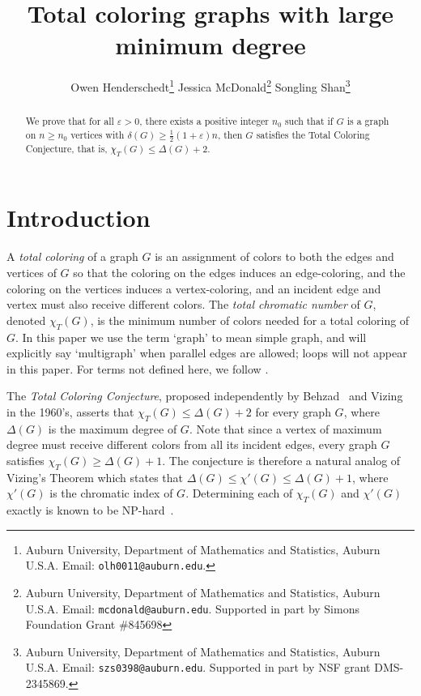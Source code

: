 \documentclass[11pt, oneside]{article}
\begin{document}
\title{Total coloring graphs with large minimum degree}
\author{
Owen Henderschedt\footnote{Auburn University, Department of Mathematics and Statistics, Auburn U.S.A.
  Email: {\tt olh0011@auburn.edu}.}    
\qquad
Jessica McDonald\footnote{Auburn University, Department of Mathematics and Statistics, Auburn U.S.A.
  Email: {\tt mcdonald@auburn.edu}.   
Supported in part by Simons Foundation Grant \#845698}
\qquad
Songling Shan\footnote{Auburn University, Department of Mathematics and Statistics, Auburn U.S.A.
  Email: {\tt szs0398@auburn.edu}. Supported in part by NSF  grant 
			DMS-2345869.}
}



\date{}

\maketitle

\begin{abstract}  
We prove that for all $\varepsilon>0$, there exists a positive integer $n_0$ such that if $G$ is a graph on $n\geq n_0$ vertices with $\delta(G)\geq\tfrac{1}{2}(1 + \varepsilon)n$,  then $G$ satisfies the Total Coloring Conjecture, that is, $\chi_T(G)\leq \Delta(G)+2$.
\end{abstract}

\vspace*{.3in}

\section{Introduction}

A \emph{total coloring} of a graph $G$ is an assignment of colors to both the edges and vertices of $G$ so that the  coloring on the edges induces an edge-coloring,  and the coloring on the vertices induces a vertex-coloring, and an incident edge and vertex must also receive different colors. The \emph{total chromatic number} of $G$, denoted $\chi_T(G)$, is the minimum number of colors needed for a total coloring of $G$. In this paper we use the term `graph' to mean simple graph, and will explicitly say `multigraph' when parallel edges are allowed; loops will not appear in this paper.  For terms not defined here, we follow \cite{WestText}.

The \emph{Total Coloring Conjecture}, proposed independently by  Behzad~\cite{Behzad-total-coloring} and Vizing~\cite{Vizing-total-coloring} in the 1960's, asserts that $\chi_T(G) \le \Delta(G)+2$ for every graph $G$, where $\Delta(G)$ is the maximum degree of $G$. Note that since a vertex of maximum degree must receive different colors from all its incident edges, every graph $G$ satisfies $\chi_T(G) \ge \Delta(G)+1$. The conjecture is therefore a natural analog of Vizing's Theorem which states that $\Delta(G) \leq \chi'(G) \leq \Delta(G)+1$, where $\chi'(G)$ is the chromatic index of $G$. Determining each of  $\chi_T(G)$ and $\chi'(G)$  exactly is  known to be NP-hard~\cite{Holyer,NPhTotal}.
\end{document}
